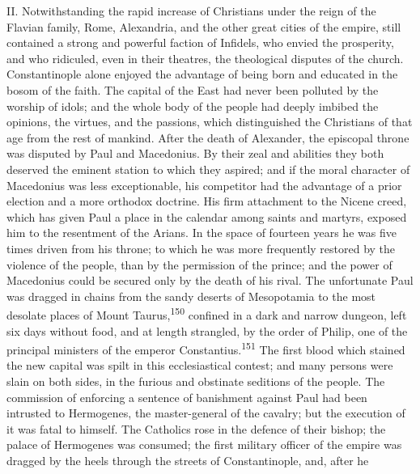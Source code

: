 
II. Notwithstanding the rapid increase of Christians under the
reign of the Flavian family, Rome, Alexandria, and the other
great cities of the empire, still contained a strong and powerful
faction of Infidels, who envied the prosperity, and who
ridiculed, even in their theatres, the theological disputes of
the church. Constantinople alone enjoyed the advantage of being
born and educated in the bosom of the faith. The capital of the
East had never been polluted by the worship of idols; and the
whole body of the people had deeply imbibed the opinions, the
virtues, and the passions, which distinguished the Christians of
that age from the rest of mankind. After the death of Alexander,
the episcopal throne was disputed by Paul and Macedonius. By
their zeal and abilities they both deserved the eminent station
to which they aspired; and if the moral character of Macedonius
was less exceptionable, his competitor had the advantage of a
prior election and a more orthodox doctrine. His firm attachment
to the Nicene creed, which has given Paul a place in the calendar
among saints and martyrs, exposed him to the resentment of the
Arians. In the space of fourteen years he was five times driven
from his throne; to which he was more frequently restored by the
violence of the people, than by the permission of the prince; and
the power of Macedonius could be secured only by the death of his
rival. The unfortunate Paul was dragged in chains from the sandy
deserts of Mesopotamia to the most desolate places of Mount
Taurus,\textsuperscript{150} confined in a dark and narrow dungeon, left six days
without food, and at length strangled, by the order of Philip,
one of the principal ministers of the emperor Constantius.\textsuperscript{151}
The first blood which stained the new capital was spilt in this
ecclesiastical contest; and many persons were slain on both
sides, in the furious and obstinate seditions of the people. The
commission of enforcing a sentence of banishment against Paul had
been intrusted to Hermogenes, the master-general of the cavalry;
but the execution of it was fatal to himself. The Catholics rose
in the defence of their bishop; the palace of Hermogenes was
consumed; the first military officer of the empire was dragged by
the heels through the streets of Constantinople, and, after he
